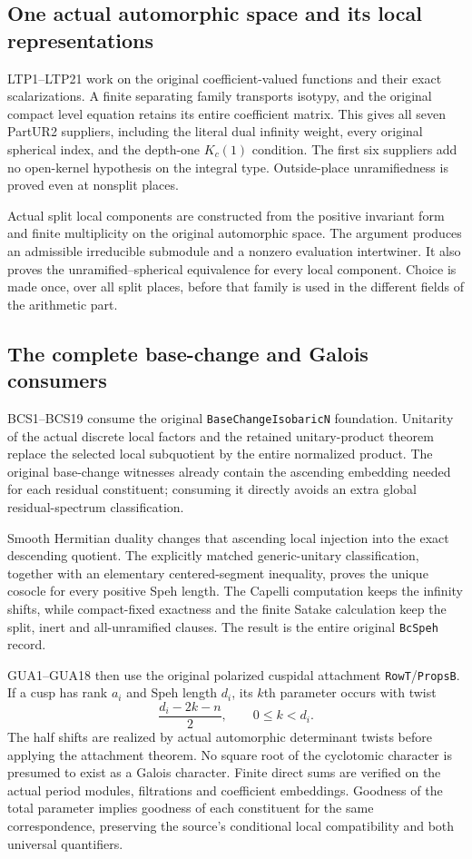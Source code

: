 \subsection{One actual automorphic space and its local representations}

LTP1--LTP21 work on the original coefficient-valued functions and
their exact scalarizations.  A finite separating family transports
isotypy, and the original compact level equation retains its entire
coefficient matrix.  This gives all seven PartUR2 suppliers,
including the literal dual infinity weight, every original
spherical index, and the depth-one $K_c(1)$ condition.
The first six suppliers add no open-kernel hypothesis on the
integral type.  Outside-place unramifiedness is proved even at
nonsplit places.

Actual split local components are constructed from the positive
invariant form and finite multiplicity on the original automorphic
space.  The argument produces an admissible irreducible submodule
and a nonzero evaluation intertwiner.  It also proves the
unramified--spherical equivalence for every local component.
Choice is made once, over all split places, before that family is
used in the different fields of the arithmetic part.

\subsection{The complete base-change and Galois consumers}

BCS1--BCS19 consume the original
\texttt{BaseChangeIsobaricN} foundation.  Unitarity of the actual
discrete local factors and the retained unitary-product theorem
replace the selected local subquotient by the entire normalized
product.  The original base-change witnesses already contain the
ascending embedding needed for each residual constituent; consuming
it directly avoids an extra global residual-spectrum classification.

Smooth Hermitian duality changes that ascending local injection
into the exact descending quotient.  The explicitly matched
generic-unitary classification, together with an elementary
centered-segment inequality, proves the unique cosocle for every
positive Speh length.  The Capelli computation keeps the infinity
shifts, while compact-fixed exactness and the finite Satake
calculation keep the split, inert and all-unramified clauses.
The result is the entire original \texttt{BcSpeh} record.

GUA1--GUA18 then use the original polarized cuspidal attachment
\texttt{RowT}/\texttt{PropsB}.  If a cusp has rank $a_i$ and
Speh length $d_i$, its $k$th parameter occurs with twist
\[
                 \frac{d_i-2k-n}{2},\qquad 0\le k<d_i.
\]
The half shifts are realized by actual automorphic determinant
twists before applying the attachment theorem.  No square root of
the cyclotomic character is presumed to exist as a Galois character.
Finite direct sums are verified on the actual period modules,
filtrations and coefficient embeddings.  Goodness of the total
parameter implies goodness of each constituent for the same
correspondence, preserving the source's conditional local
compatibility and both universal quantifiers.

